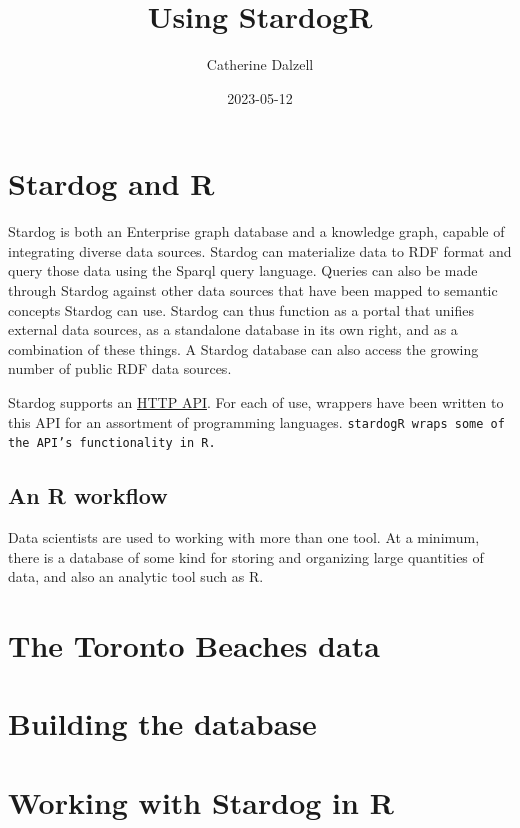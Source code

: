 \documentclass{article}\usepackage[]{graphicx}\usepackage[]{xcolor}
\title{Using StardogR}
\author{Catherine Dalzell}
\date{2023-05-12}
\begin{document}
\maketitle

\tableofcontents




\section{Stardog and R}

Stardog is both an Enterprise graph database and a knowledge graph, capable of integrating diverse data sources. Stardog can materialize data to RDF format and query those data using the Sparql query language. Queries can also be made through Stardog against other data sources that have been mapped to semantic concepts Stardog can use. Stardog can thus function as a portal that unifies external data sources, as a standalone database in its own right, and as a combination of these things. A Stardog database can also access the growing number of public RDF data sources.

Stardog supports an \href{https://stardog-union.github.io/http-docs/}{HTTP API}. For each of use, wrappers have been written to this API for an assortment of programming languages. \tt{stardogR} wraps some of the API's functionality in R.

\subsection{An R workflow}

Data scientists are used to working with more than one tool. At a minimum, there is a database of some kind for storing and organizing large quantities of data, and also an analytic tool such as R.

\section{The Toronto Beaches data}

\section{Building the database}

\section{Working with Stardog in R}
\end{document}
